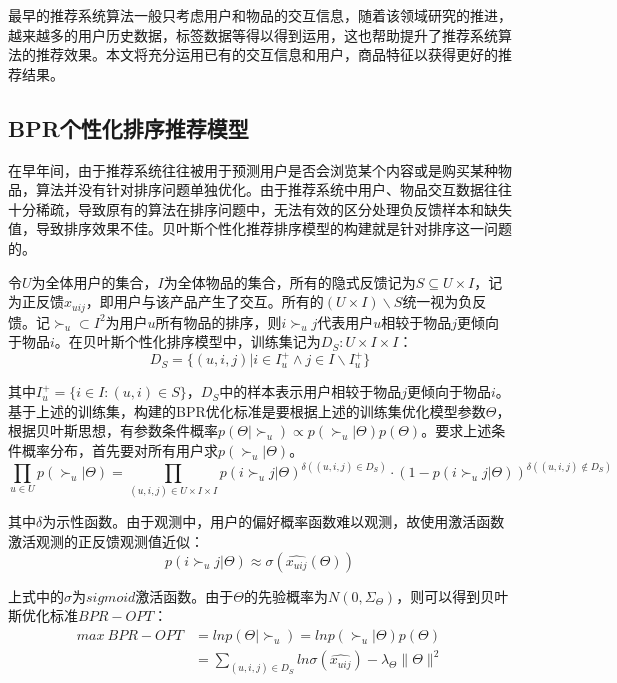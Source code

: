 \documentclass[lang=cn,11pt,a4paper,cite=authoryear]{elegantpaper}
\begin{document}
最早的推荐系统算法一般只考虑用户和物品的交互信息，随着该领域研究的推进，越来越多的用户历史数据，标签数据等得以得到运用，这也帮助提升了推荐系统算法的推荐效果。本文将充分运用已有的交互信息和用户，商品特征以获得更好的推荐结果。

\subsection{BPR个性化排序推荐模型}
在早年间，由于推荐系统往往被用于预测用户是否会浏览某个内容或是购买某种物品，算法并没有针对排序问题单独优化。由于推荐系统中用户、物品交互数据往往十分稀疏，导致原有的算法在排序问题中，无法有效的区分处理负反馈样本和缺失值，导致排序效果不佳。贝叶斯个性化推荐排序模型的构建就是针对排序这一问题的。

令$U$为全体用户的集合，$I$为全体物品的集合，所有的隐式反馈记为$S \subseteq U \times I$，记为正反馈$x_{uij}$，即用户与该产品产生了交互。所有的$(U \times I) \backslash S$统一视为负反馈。记$\succ_u \subset I^2$为用户$u$所有物品的排序，则$i \succ_u j$代表用户$u$相较于物品$j$更倾向于物品$i$。在贝叶斯个性化排序模型中，训练集记为$D_S : U \times I \times I$：
\begin{equation}
  D_S = \{ (u, i, j) | i \in I_u^+ \wedge j \in I \backslash I_u^+\}
\end{equation}

其中$I_u^+ = \{i \in I: (u, i) \in S\}$，$D_S$中的样本表示用户相较于物品$j$更倾向于物品$i$。基于上述的训练集，构建的BPR优化标准是要根据上述的训练集优化模型参数$\Theta$，根据贝叶斯思想，有参数条件概率$p(\Theta|\succ_u) \varpropto p(\succ_u|\Theta)p(\Theta)$。要求上述条件概率分布，首先要对所有用户求$p(\succ_u|\Theta)$。
\begin{equation}
  \prod_{u \in U}p(\succ_u|\Theta)=\prod_{(u, i, j) \in U \times I \times I}p(i \succ_u j|\Theta)^{\delta((u, i, j)\in D_S)} \cdot (1- p(i \succ_u j|\Theta))^{\delta((u, i, j) \notin D_S)}
\end{equation}

其中$\delta$为示性函数。由于观测中，用户的偏好概率函数难以观测，故使用激活函数激活观测的正反馈观测值近似：
\begin{equation}
  p(i \succ_u j|\Theta) \approx \sigma(\hat{x_{uij}}(\Theta))
\end{equation}

上式中的$\sigma$为$sigmoid$激活函数。由于$\Theta$的先验概率为$N(0, \Sigma_{\Theta})$，则可以得到贝叶斯优化标准$BPR-OPT$：
\begin{equation}
  \begin{split}
    max \ BPR-OPT &= ln p(\Theta|\succ_u) = ln p(\succ_u|\Theta)p(\Theta) \\
  &= \sum_{(u, i, j)\in D_S}ln\sigma(\hat{x_{uij}}) - \lambda_{\Theta}\parallel \Theta \parallel^2
  \end{split}
\end{equation}
\end{document}
